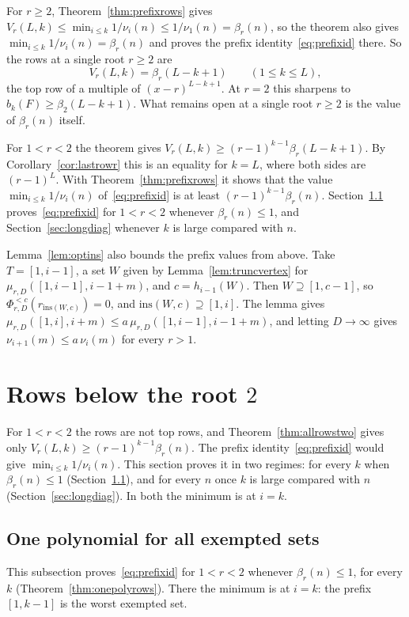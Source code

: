\documentclass[11pt]{article}
\begin{document}
For $r\ge2$, Theorem~\ref{thm:prefixrows} gives
$V_r(L,k)\le\min_{i\le k}1/\nu_i(n)\le1/\nu_1(n)=\beta_r(n)$, so the theorem
also gives $\min_{i\le k}1/\nu_i(n)=\beta_r(n)$ and proves the prefix
identity~\eqref{eq:prefixid} there.  So the rows at a single
root $r\ge2$ are
\[
  V_r(L,k)=\beta_r(L-k+1)\qquad(1\le k\le L),
\]
the top row of a multiple of $(x-r)^{L-k+1}$.  At $r=2$ this sharpens
\cite[Theorem~4.13]{coefficient-mass} to $b_k(F)\ge\beta_2(L-k+1)$.  What
remains open at a single root $r\ge2$ is the value of $\beta_r(n)$ itself.

For $1<r<2$ the theorem gives $V_r(L,k)\ge(r-1)^{k-1}\beta_r(L-k+1)$.  By
Corollary~\ref{cor:lastrowr} this is an equality for $k=L$, where both sides
are $(r-1)^L$.  With Theorem~\ref{thm:prefixrows} it shows that the
value $\min_{i\le k}1/\nu_i(n)$ of~\eqref{eq:prefixid} is at least
$(r-1)^{k-1}\beta_r(n)$.  Section~\ref{sec:onepoly} proves~\eqref{eq:prefixid}
for $1<r<2$ whenever $\beta_r(n)\le1$, and Section~\ref{sec:longdiag}
whenever $k$ is large compared with $n$.

Lemma~\ref{lem:optins} also bounds the prefix values from above.  Take
$T=[1,i-1]$, a set $W$ given by Lemma~\ref{lem:truncvertex} for
$\mu_{r,D}([1,i-1],i-1+m)$, and $c=h_{i-1}(W)$.  Then $W\supseteq[1,c-1]$,
so $\Phi_{r,D}^{<c}(r_{\mathrm{ins}(W,c)})=0$, and
$\mathrm{ins}(W,c)\supseteq[1,i]$.  The lemma gives
$\mu_{r,D}([1,i],i+m)\le a\,\mu_{r,D}([1,i-1],i-1+m)$, and letting
$D\to\infty$ gives $\nu_{i+1}(m)\le a\,\nu_i(m)$ for every $r>1$.

\section{Rows below the root \texorpdfstring{$2$}{2}}\label{sec:belowtwo}

For $1<r<2$ the rows are not top rows, and Theorem~\ref{thm:allrowstwo}
gives only $V_r(L,k)\ge(r-1)^{k-1}\beta_r(n)$.  The prefix identity~\eqref{eq:prefixid}
would give $\min_{i\le k}1/\nu_i(n)$.  This section proves it in two regimes: for
every $k$ when $\beta_r(n)\le1$ (Section~\ref{sec:onepoly}), and for every
$n$ once $k$ is large compared with $n$ (Section~\ref{sec:longdiag}).  In
both the minimum is at $i=k$.

\subsection{One polynomial for all exempted sets}\label{sec:onepoly}

This subsection proves~\eqref{eq:prefixid} for $1<r<2$ whenever $\beta_r(n)\le1$,
for every $k$ (Theorem~\ref{thm:onepolyrows}).  There the minimum is at
$i=k$: the prefix $[1,k-1]$ is the worst exempted set.
\end{document}
